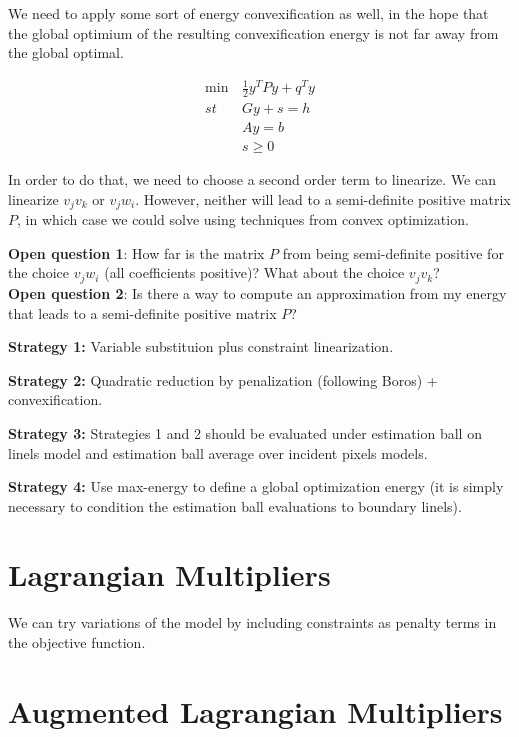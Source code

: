 We need to apply some sort of energy convexification as well, in the hope that the global optimium of the resulting convexification energy is not far away from the global optimal.
	
	\begin{equation}
	\begin{aligned}
		\min &\frac{1}{2} y^TPy + q^Ty\\
		st \quad &Gy + s = h\\
		&Ay = b \\
		& s \geq 0
		\label{eq:quadratic-formulation}
	\end{aligned}
	\end{equation}
	
	In order to do that, we need to choose a second order term to linearize. We can linearize $v_jv_k$ or $v_jw_i$. However, neither will lead to a semi-definite positive matrix $P$, in which case we could solve using techniques from convex optimization.

	\textbf{Open question 1}: How far is the matrix $P$ from being semi-definite positive for the choice $v_jw_i$ (all coefficients positive)? What about the choice $v_jv_k$? \\
		
	\textbf{Open question 2}: Is there a way to compute an approximation from my energy that leads to a semi-definite positive matrix $P$?
	
	\textbf{Strategy 1:} Variable substituion plus constraint linearization.
	
	\textbf{Strategy 2:} Quadratic reduction by penalization (following Boros) + convexification.
	
	\textbf{Strategy 3:} Strategies 1 and 2 should be evaluated under estimation ball on linels model and estimation ball average over incident pixels models.
	
	\textbf{Strategy 4:} Use max-energy to define a global optimization energy (it is simply necessary to condition the estimation ball evaluations to boundary linels).
	
	
\section{Lagrangian Multipliers}

	We can try variations of the model by including constraints as penalty terms in the objective function.
	
	
\section{Augmented Lagrangian Multipliers}	


